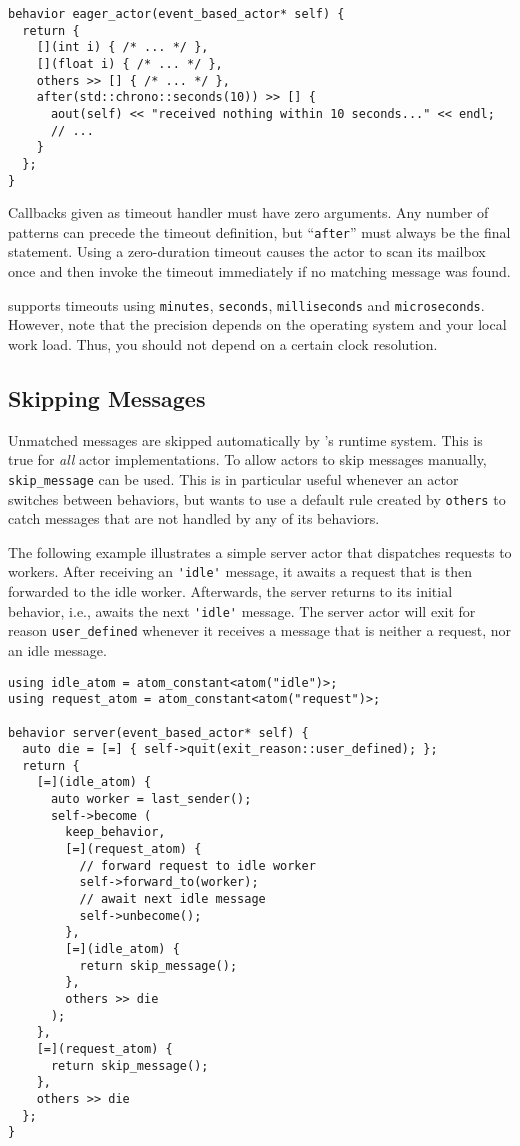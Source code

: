 \begin{lstlisting}
behavior eager_actor(event_based_actor* self) {
  return {
    [](int i) { /* ... */ },
    [](float i) { /* ... */ },
    others >> [] { /* ... */ },
    after(std::chrono::seconds(10)) >> [] {
      aout(self) << "received nothing within 10 seconds..." << endl;
      // ...
    }
  };
}
\end{lstlisting}

Callbacks given as timeout handler must have zero arguments.
Any number of patterns can precede the timeout definition, but  ``\lstinline^after^'' must always be the final statement.
Using a zero-duration timeout causes the actor to scan its mailbox once and then invoke the timeout immediately if no matching message was found.

\lib supports timeouts using \lstinline^minutes^, \lstinline^seconds^, \lstinline^milliseconds^ and \lstinline^microseconds^.
However, note that the precision depends on the operating system and your local work load.
Thus, you should not depend on a certain clock resolution.

\clearpage
\subsection{Skipping Messages}

Unmatched messages are skipped automatically by \lib's runtime system.
This is true for \textit{all} actor implementations.
To allow actors to skip messages manually, \lstinline^skip_message^ can be used.
This is in particular useful whenever an actor switches between behaviors, but wants to use a default rule created by \lstinline^others^ to catch messages that are not handled by any of its behaviors.

The following example illustrates a simple server actor that dispatches requests to workers.
After receiving an \lstinline^'idle'^ message, it awaits a request that is then forwarded to the idle worker.
Afterwards, the server returns to its initial behavior, i.e., awaits the next \lstinline^'idle'^ message.
The server actor will exit for reason \lstinline^user_defined^ whenever it receives a message that is neither a request, nor an idle message.

\begin{lstlisting}
using idle_atom = atom_constant<atom("idle")>;
using request_atom = atom_constant<atom("request")>;

behavior server(event_based_actor* self) {
  auto die = [=] { self->quit(exit_reason::user_defined); };
  return {
    [=](idle_atom) {
      auto worker = last_sender();
      self->become (
        keep_behavior,
        [=](request_atom) {
          // forward request to idle worker
          self->forward_to(worker);
          // await next idle message
          self->unbecome();
        },
        [=](idle_atom) {
          return skip_message();
        },
        others >> die
      );
    },
    [=](request_atom) {
      return skip_message();
    },
    others >> die
  };
}
\end{lstlisting}
